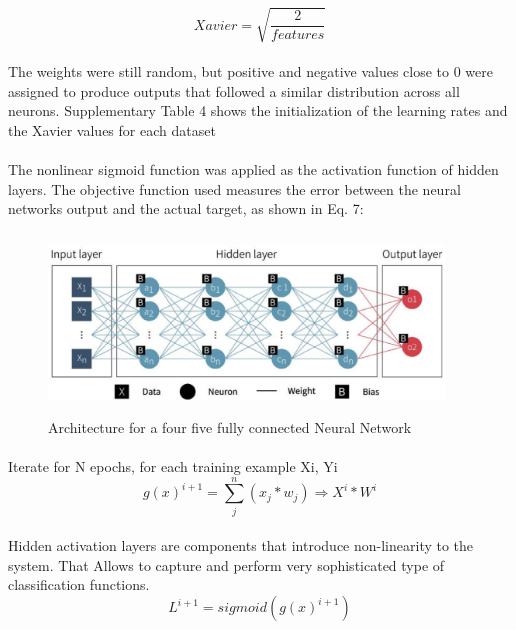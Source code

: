 \documentclass{llncs}       %
\begin{document}
\begin{equation} 
Xavier = \sqrt{\frac{2}{features}}
\end{equation}

\paragraph{}
The weights were still random, but positive and negative values close to 0 were assigned to produce outputs that followed a similar distribution across all neurons. Supplementary Table 4 shows the initialization of the learning rates and the Xavier values for each dataset

\paragraph{}
The nonlinear sigmoid function was applied as the activation function of hidden layers. The objective function used measures the error between the neural networks output and the actual target, as shown in Eq. 7: 

\begin{figure}[h]
\centering
\includegraphics[width=10.51cm,height=4.77cm]{media/deep-nn1.eps}
\caption{Architecture for a four five fully connected 
Neural Network}
\end{figure}


\paragraph{}Iterate for N epochs,  for each training example Xi, Yi 
\begin{equation} 
g(x)^{i+1}=\sum_j^n(x_{j}*w_{j})\Rightarrow X^{i}*W^{i}
\end{equation}

\paragraph{}
Hidden activation layers are components that introduce non-linearity to 
the system. That Allows to capture and perform very sophisticated type 
of classification functions.
\begin{equation} 
L^{i+1}=sigmoid(g(x)^{i+1})
\end{equation}
\end{document}
